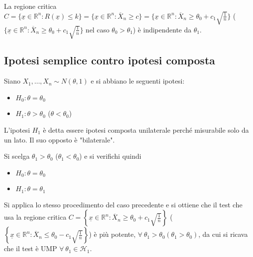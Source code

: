 \documentclass[hidelinks, 10pt]{report}
\begin{document}
\begin{oss}
La regione critica $ C = \{ \underline{x} \in \mathbb{R}^{n} : R(\underline{x}) \le k \} = \{ \underline{x} \in \mathbb{R}^{n} : \overline{X}_{n} \ge c \} = \{ \underline{x} \in \mathbb{R}^{n} : \overline{X}_{n} \ge \theta_{0} + c_{1} \sqrt{\frac{1}{n}} \} $ ($ \{ \underline{x} \in \mathbb{R}^{n} : \overline{X}_{n} \ge \theta_{0} + c_{1} \sqrt{\frac{1}{n}} \} $ nel caso $ \theta_{0} > \theta_{1} $) \`e indipendente da $ \theta_{1} $.
\end{oss}

\subsection{Ipotesi semplice contro ipotesi composta}
Siano $ X_{1}, \dotsc, X_{n} \sim N(\theta, 1) $ e si abbiano le seguenti ipotesi:
\begin{itemize}
\item $ H_{0} : \theta = \theta_{0} $
\item $ H_{1} : \theta > \theta_{0} $ ($ \theta < \theta_{0} $)
\end{itemize}

\begin{defn}
L'ipotesi $ H_{1} $ \`e detta essere ipotesi composta unilaterale perch\'e misurabile solo da un lato. Il suo opposto \`e "bilaterale". 
\end{defn}

Si scelga $ \theta_{1} > \theta_{0} $ ($ \theta_{1} < \theta_{0} $) e si verifichi quindi

\begin{itemize}
\item $ H_{0} : \theta = \theta_{0} $
\item $ H_{1} : \theta = \theta_{1} $
\end{itemize}

Si applica lo stesso procedimento del caso precedente e si ottiene che il test che usa la regione critica $ C = \left\{ \underline{x} \in \mathbb{R}^{n} : \overline{X}_{n} \ge \theta_{0} + c_{1} \sqrt{\frac{1}{n}} \right\} $ ($ \left\{ \underline{x} \in \mathbb{R}^{n} : \overline{X}_{n} \le \theta_{0} - c_{1} \sqrt{\frac{1}{n}} \right\} $) \`e pi\`u potente, $ \forall\ \theta_{1} > \theta_{0} (\theta_{1} > \theta_{0}) $, da cui si ricava che il test \`e UMP $ \forall\ \theta_{1} \in \mathcal{H}_{1} $.
\end{document}
